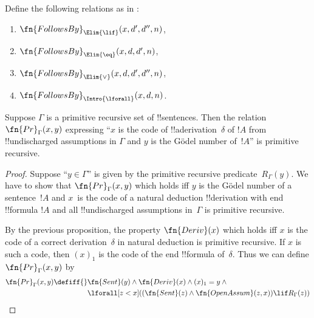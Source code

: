 \documentclass[../../include/open-logic-section]{subfiles}
\begin{document}
\begin{prob}
Define the following relations as in
:
\begin{enumerate}
\item $\fn{FollowsBy}_{\Elim{\lif}}(x, d', d'', n)$,
\item $\fn{FollowsBy}_{\Elim{\eq}}(x, d, d', n)$,
\item $\fn{FollowsBy}_{\Elim{\lor}}(x, d, d', d'', n)$,
\item $\fn{FollowsBy}_{\Intro{\lforall}}(x, d, n)$.
\end{enumerate}
\end{prob}

\begin{prop}
Suppose $\Gamma$ is a primitive recursive set of !!{sentence}s.  Then
the relation $\fn{Pr}_\Gamma(x, y)$ expressing ``$x$ is the code of
!!a{derivation}~$\delta$ of $!A$ from !!{undischarged} assumptions in $\Gamma$
and $y$ is the G\"odel number of~$!A$'' is
primitive recursive.
\end{prop}

\begin{proof}
Suppose ``$y \in \Gamma$'' is given by the primitive recursive
predicate~$R_\Gamma(y)$.  We have to show that $\fn{Pr}_\Gamma(x, y)$
which holds iff $y$ is the G\"odel number of a sentence~$!A$ and
$x$~is the code of a natural deduction !!{derivation} with end
!!{formula} $!A$ and all !!{undischarged} assumptions in~$\Gamma$ is
primitive recursive.

By the previous proposition, the property $\fn{Deriv}(x)$ which holds
iff $x$ is the code of a correct derivation~$\delta$ in natural deduction is
primitive recursive.  If $x$ is such a code, then $(x)_1$ is the code
of the end !!{formula} of~$\delta$. Thus we can
define $\fn{Pr}_\Gamma(x, y)$ by
\begin{align*}
\fn{Pr}_\Gamma(x, y) \defiff {}&
\fn{Sent}(y) \land \fn{Deriv}(x) \land (x)_1=y \land {} \\
& \lforall[z < x]((\fn{Sent}(z) \land \fn{OpenAssum}(z, x)) \lif R_\Gamma(z))
\end{align*}
\end{proof}
\end{document}
